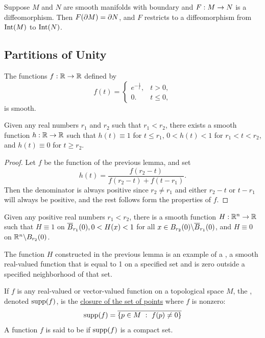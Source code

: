 \begin{thm}
Suppose $M$ and $N$ are smooth manifolds with boundary and $F:M\rightarrow N$ is a diffeomorphism. Then $F(\partial M) = \partial N$, and $F$ restricts to a diffeomorphism from $\text{Int}(M)$ to $\text{Int}(N)$.
\end{thm}
\newpage
\subsection{Partitions of Unity}\nl

\begin{lem}
The functions $f:\mathbb{R}\rightarrow \mathbb{R}$ defined by
\[f(t) = \begin{cases} e^{-\frac{1}{t}}, & t > 0,\\ 0. & t\leq 0,\end{cases}\]
is smooth.
\end{lem}

\begin{lem}
Given any real numbers $r_1$ and $r_2$ such that $r_1 < r_2$, there exists a smooth function $h:\mathbb{R}\rightarrow \mathbb{R}$ such that $h(t) \equiv 1$ for $t\leq r_1$, $0 < h(t) < 1$ for $r_1 < t < r_2$, and $h(t) \equiv 0$ for $t\geq r_2$.
\end{lem}

\begin{proof}
Let $f$ be the function of the previous lemma, and set
\[h(t) = \frac{f(r_2 - t)}{f(r_2 - t) + f(t - r_1)}.\]
Then the denominator is always positive since $r_2 \neq r_1$ and either $r_2 - t$ or $t - r_1$ will always be positive, and the rest follows form the properties of $f$.
\end{proof}

\begin{lem}
Given any positive real numbers $r_1 < r_2$, there is a smooth function $H:\mathbb{R}^n\rightarrow \mathbb{R}$ such that $H \equiv 1$ on $\overline B_{r_1}(0), 0 < H(x) < 1$ for all $x \in B_{r_2}(0)\backslash \overline B_{r_1}(0)$, and $H\equiv 0$ on $\mathbb{R}^n \backslash B_{r_2}(0)$.
\end{lem}

\dfn The function $H$ constructed in the previous lemma is an example of a , a smooth real-valued function that is equal to 1 on a specified set and is zero outside a specified neighborhood of that set.

\dfn If $f$ is any real-valued or vector-valued function on a topological space $M$, the , denoted $\text{supp}(f)$, is the \ul{closure of the set of points} where $f$ is nonzero:
\[\supp(f) = \ol{\{p\in M\ :\ f(p)\neq 0\}}\]
A function $f$ is said to be  if $\text{supp}(f)$ is a compact set.

